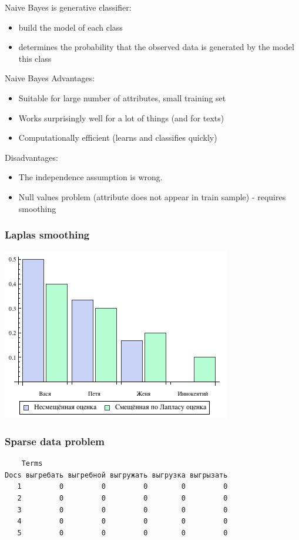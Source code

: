 \documentclass[svgnames]{beamer}
\begin{document}
\begin{frame}
  Naive Bayes is generative classifier:

  \begin{itemize}
  \item build the model of each class
  \item determines the probability that the observed data is generated by the model
    this class
  \end{itemize}
\end{frame}

\begin{frame}{Naive Bayes}
Advantages:
  \begin{itemize}
  \item Suitable for large number of attributes, small training set
  \item Works surprisingly well for a lot of things (and for texts)
  \item Computationally efficient (learns and classifies quickly)
  \end{itemize}
  Disadvantages:
  \begin{itemize}
  \item The independence assumption is wrong.
  \item Null values problem (attribute does not appear in train
    sample) - requires smoothing
  \end{itemize}
\end{frame}

\begin{frame}
  \frametitle{Laplas smoothing}
  \includegraphics[width=.7\textwidth]{additive-smoothing}
\end{frame}


\begin{frame}[fragile]
  \frametitle{Sparse data problem}
\begin{verbatim}
    Terms
Docs выгребать выгребной выгружать выгрузка выгрызать
   1         0         0         0        0         0
   2         0         0         0        0         0
   3         0         0         0        0         0
   4         0         0         0        0         0
   5         0         0         0        0         0
\end{verbatim}
\end{frame}
\end{document}

